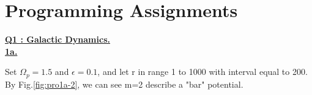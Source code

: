 \documentclass{article}
\begin{document}
\section{Programming Assignments}

\underline{\textbf{Q1 : Galactic Dynamics.}}\\
\underline{\textbf{1a.}}

Set $\Omega_p=1.5$ and $\epsilon=0.1$, and let r in range 1 to 1000 with interval equal to 200. By Fig.\ref{fig:pro1a-2}, we can see m=2 describe a "bar" potential.
\end{document}
